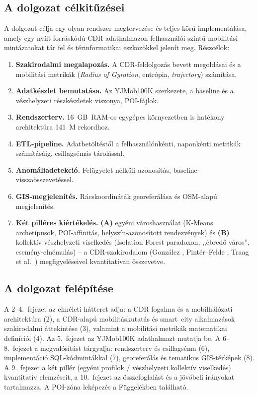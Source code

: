 \subsection{A dolgozat célkitűzései}
\label{subsec:goals}

A dolgozat célja egy olyan rendszer megtervezése és teljes körű implementálása, amely egy nyílt forráskódú CDR-adathalmazon felhasználói szintű mobilitási mintázatokat tár fel és térinformatikai eszközökkel jelenít meg. Részcélok:

\begin{enumerate}
    \item \textbf{Szakirodalmi megalapozás.} A CDR-feldolgozás bevett megoldásai és a mobilitási metrikák (\textit{Radius of Gyration}, entrópia, \textit{trajectory}) számítása.
    \item \textbf{Adatkészlet bemutatása.} Az YJMob100K szerkezete, a baseline és a vészhelyzeti részkészletek viszonya, POI-fájlok.
    \item \textbf{Rendszerterv.} 16~GB~RAM-os egygépes környezetben is hatékony architektúra 141~M rekordhoz.
    \item \textbf{ETL-pipeline.} Adatbetöltéstől a felhasználónkénti, naponkénti metrikák számításáig, csillagsémás tárolással.
    \item \textbf{Anomáliadetekció.} Felügyelet nélküli azonosítás, baseline-visszaösszevetéssel.
    \item \textbf{GIS-megjelenítés.} Rácskoordináták georeferálása és OSM-alapú megjelenítés.
    \item \textbf{Két pilléres kiértékelés.} \textbf{(A)} egyéni városhasználat (K-Means archetípusok, POI-affinitás, helyszín-azonosított rendezvények) és \textbf{(B)} kollektív vészhelyzeti viselkedés (Isolation Forest paradoxon, ,,ébredő város'', esemény-elnémulás) -- a CDR-szakirodalom (González \cite{gonzalez2008understanding}, Pintér--Felde \cite{pinter2021evaluating, pinter2022awakening}, Traag et al.\ \cite{traag2011social}) megfigyeléseivel kvantitatívan összevetve.
\end{enumerate}

\subsection{A dolgozat felépítése}
\label{subsec:structure}

A 2--4.\ fejezet az elméleti hátteret adja: a CDR fogalma és a mobilhálózati architektúra (2), a CDR-alapú mobilitáskutatás és smart~city alkalmazások szakirodalmi áttekintése (3), valamint a mobilitási metrikák matematikai definíciói (4). Az 5.\ fejezet az YJMob100K adathalmazt mutatja be. A 6--8.\ fejezet a megvalósítást tárgyalja: rendszerterv és csillagséma (6), implementáció SQL-kódmintákkal (7), georeferálás és tematikus GIS-térképek (8). A 9.\ fejezet a két pillér (egyéni profilok / vészhelyzeti kollektív viselkedés) kvantitatív elemzéseit, a 10.\ fejezet az összefoglalást és a jövőbeli irányokat tartalmazza. A POI-zóna leképezés a Függelékben található.
